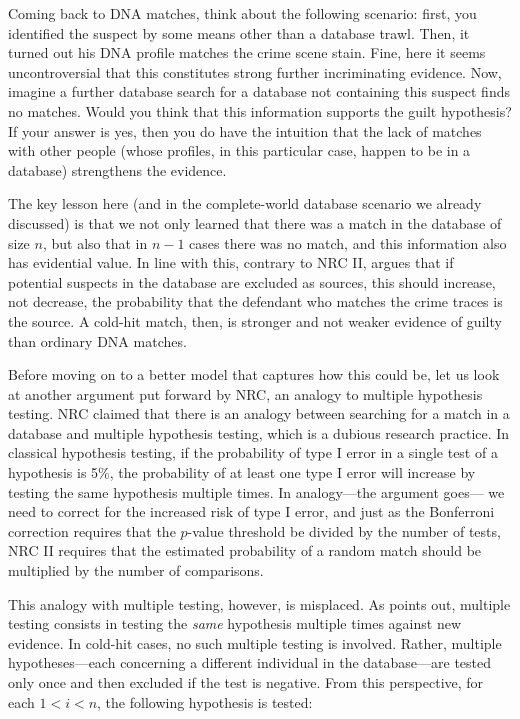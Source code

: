 \documentclass[10pt,dvipsnames,enabledeprecatedfontcommands]{scrartcl}
\begin{document}
Coming back to DNA matches, think about the following scenario: first,
you identified the suspect by some means other than a database trawl.
Then, it turned out his DNA profile matches the crime scene stain. Fine,
here it seems uncontroversial that this constitutes strong further
incriminating evidence. Now, imagine a further database search for a
database not containing this suspect finds no matches. Would you think
that this information supports the guilt hypothesis? If your answer is
yes, then you do have the intuition that the lack of matches with other
people (whose profiles, in this particular case, happen to be in a
database) strengthens the evidence.

The key lesson here (and in the complete-world database scenario we
already discussed) is that we not only learned that there was a match in
the database of size \(n\), but also that in \(n-1\) cases there was no
match, and this information also has evidential value. In line with
this, contrary to NRC II, \cite{donnelly1999DNADatabaseSearches} argues
that if potential suspects in the database are excluded as sources, this
should increase, not decrease, the probability that the defendant who
matches the crime traces is the source. A cold-hit match, then, is
stronger and not weaker evidence of guilty than ordinary DNA matches.

Before moving on to a better model that captures how this could be, let
us look at another argument put forward by NRC, an analogy to multiple
hypothesis testing. NRC claimed that there is an analogy between
searching for a match in a database and multiple hypothesis testing,
which is a dubious research practice. In classical hypothesis testing,
if the probability of type I error in a single test of a hypothesis is
5\%, the probability of at least one type I error will increase by
testing the same hypothesis multiple times. In analogy---the argument
goes--- we need to correct for the increased risk of type I error, and
just as the Bonferroni correction requires that the \(p\)-value
threshold be divided by the number of tests, NRC II requires that the
estimated probability of a random match should be multiplied by the
number of comparisons.

This analogy with multiple testing, however, is misplaced. As
\citet{balding2002DNDatabaseSearch} points out, multiple testing
consists in testing the \textit{same} hypothesis multiple times against
new evidence. In cold-hit cases, no such multiple testing is involved.
Rather, multiple hypotheses---each concerning a different individual in
the database---are tested only once and then excluded if the test is
negative. From this perspective, for each \(1 < i <n\), the following
hypothesis is tested: \vspace{1mm}
\end{document}
